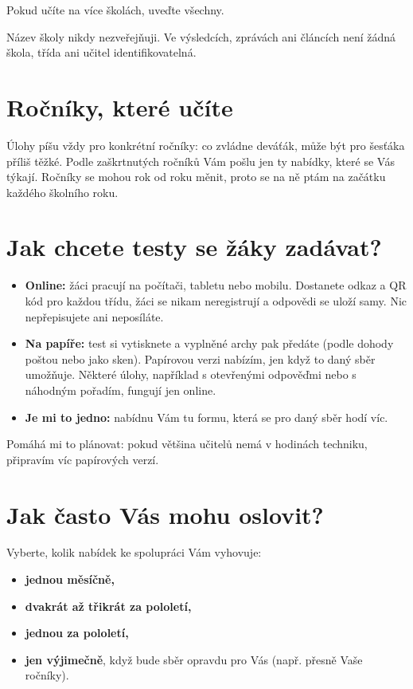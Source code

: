 \documentclass[
  12pt,
  english,
  a4paper,
  extrafontsizes,onecolumn,openright
  ]{memoir}
\providecommand{\tightlist}{%
  \setlength{\itemsep}{0pt}\setlength{\parskip}{0pt}}
\begin{document}
Pokud učíte na více školách, uveďte všechny.

Název školy nikdy nezveřejňuji. Ve výsledcích, zprávách ani článcích
není žádná škola, třída ani učitel identifikovatelná.

\section{Ročníky, které učíte}\label{spoluprace-rocniky}

Úlohy píšu vždy pro konkrétní ročníky: co zvládne deváťák, může být
pro šesťáka příliš těžké. Podle zaškrtnutých ročníků Vám pošlu jen ty
nabídky, které se Vás týkají. Ročníky se mohou rok od roku měnit,
proto se na ně ptám na začátku každého školního roku.

\section{Jak chcete testy se žáky zadávat?}\label{spoluprace-zpusob}

\begin{itemize}
\tightlist
\item
  \textbf{Online:} žáci pracují na počítači, tabletu nebo mobilu. Dostanete
  odkaz a QR kód pro každou třídu, žáci se nikam neregistrují a odpovědi
  se uloží samy. Nic nepřepisujete ani neposíláte.
\item
  \textbf{Na papíře:} test si vytisknete a vyplněné archy pak předáte (podle
  dohody poštou nebo jako sken). Papírovou verzi nabízím, jen když to
  daný sběr umožňuje. Některé úlohy, například s otevřenými odpověďmi
  nebo s náhodným pořadím, fungují jen online.
\item
  \textbf{Je mi to jedno:} nabídnu Vám tu formu, která se pro daný sběr
  hodí víc.
\end{itemize}

Pomáhá mi to plánovat: pokud většina učitelů nemá v hodinách techniku,
připravím víc papírových verzí.

\section{Jak často Vás mohu oslovit?}\label{spoluprace-frekvence}

Vyberte, kolik nabídek ke spolupráci Vám vyhovuje:

\begin{itemize}
\tightlist
\item
  \textbf{jednou měsíčně,}
\item
  \textbf{dvakrát až třikrát za pololetí,}
\item
  \textbf{jednou za pololetí,}
\item
  \textbf{jen výjimečně}, když bude sběr opravdu pro Vás (např. přesně Vaše
  ročníky).
\end{itemize}
\end{document}
